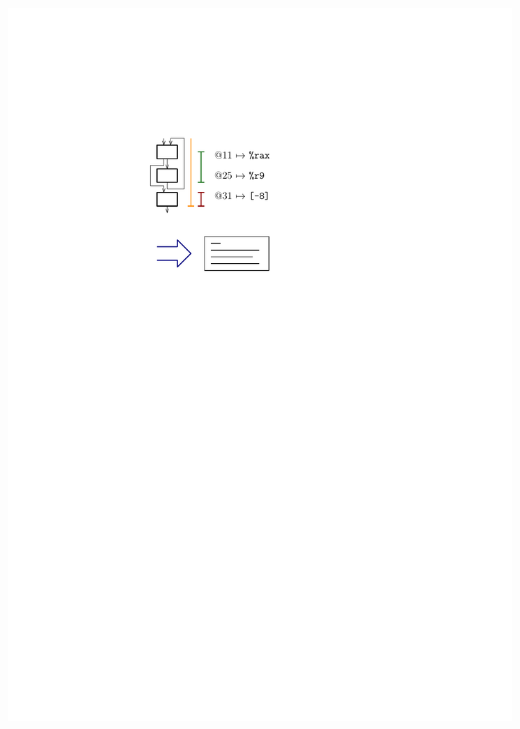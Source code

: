 \documentclass[navbaroff,en]{sdqbeamer}
\begin{document}
\begin{frame}
\begin{columns}
	\begin{column}{0.35\textwidth}
		\centering \includegraphics[scale=0.7]{images/code_generation.pdf}
	\end{column}
\end{columns}
\end{frame}
\end{document}
